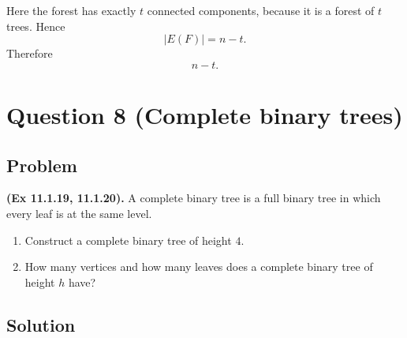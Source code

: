 \documentclass[12pt]{article}
\begin{document}
Here the forest has exactly $t$ connected components, because it is a forest of $t$ trees. Hence
\[
  |E(F)|=n-t.
\]
Therefore
\[
  \boxed{n-t}.
\]

\newpage
\section{Question 8 (Complete binary trees)}

\subsection{Problem}
\textbf{(Ex 11.1.19, 11.1.20).} A complete binary tree is a full binary tree in which every leaf is at the same level.
\begin{enumerate}[label=(\alph*)]
  \item Construct a complete binary tree of height $4$.
  \item How many vertices and how many leaves does a complete binary tree of height $h$ have?
\end{enumerate}

\subsection{Solution}
\end{document}
